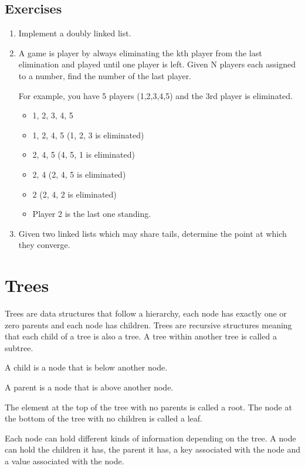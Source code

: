 \documentclass[11pt,oneside]{book}
\begin{document}
\subsection{Exercises}

\begin{enumerate}
\item Implement a doubly linked list.
\item A game is player by always eliminating the kth player from the last elimination and played until one player is left. Given N players each assigned to a number, find the number of the last player.

For example, you have 5 players (1,2,3,4,5) and the 3rd player is eliminated.

\begin{itemize}
\item 1, 2, 3, 4, 5 
\item 1, 2, 4, 5 (1, 2, 3 is eliminated)
\item 2, 4, 5 (4, 5, 1 is eliminated)
\item 2, 4 (2, 4, 5 is eliminated)
\item 2 (2, 4, 2 is eliminated)
\item Player 2 is the last one standing.
\end{itemize}
\item Given two linked lists which may share tails, determine the point at which they converge.
\end{enumerate}
\section{Trees}

Trees are data structures that follow a hierarchy, each node has exactly one or zero parents and each node has children. Trees are recursive structures meaning that each child of a tree is also a tree. A tree within another tree is called a subtree.

A child is a node that is below another node.

A parent is a node that is above another node.

The element at the top of the tree with no parents is called a root. The node at the bottom of the tree with no children is called a leaf.

Each node can hold different kinds of information depending on the tree. A node can hold the children it has, the parent it has, a key associated with the node and a value associated with the node.
\end{document}

